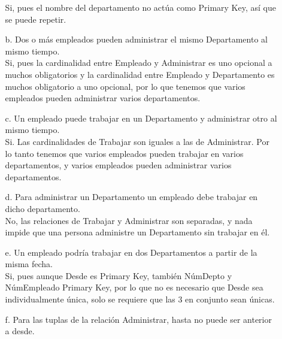 \documentclass[12pt,a4paper]{article}
\begin{document}
\begin{enumerate}
\begin{enumerate}
            Si, pues el nombre del departamento no actúa como Primary Key, así que se puede repetir.\\
            
            \item[b.] Dos o más empleados pueden administrar el mismo Departamento al mismo tiempo.\\
            
            Si, pues la cardinalidad entre Empleado y Administrar es uno opcional a muchos obligatorios y la cardinalidad entre Empleado y Departamento es muchos obligatorio a uno opcional, por lo que tenemos que varios empleados pueden administrar varios departamentos. \\
            
            \item[c.] Un empleado puede trabajar en un Departamento y administrar otro al mismo tiempo.\\
            
            Si. Las cardinalidades de Trabajar son iguales a las de Administrar. Por lo tanto tenemos que varios empleados pueden trabajar en varios departamentos, y varios empleados pueden administrar varios departamentos. \\
            
            \item[d.] Para administrar un Departamento un empleado debe trabajar en dicho departamento.\\
            
            No, las relaciones de Trabajar y Administrar son separadas, y nada impide que una persona administre un Departamento sin trabajar en él. \\
            
            \item[e.] Un empleado podría trabajar en dos Departamentos a partir de la misma fecha.\\
            
            Si, pues aunque Desde es Primary Key, también NúmDepto y NúmEmpleado Primary Key, por lo que no es necesario que Desde sea individualmente única, solo se requiere que las 3 en conjunto sean únicas.\\
            
            \item[f.] Para las tuplas de la relación Administrar, hasta no puede ser anterior a desde.\\
            

\end{enumerate}
\end{enumerate}
\end{document}

